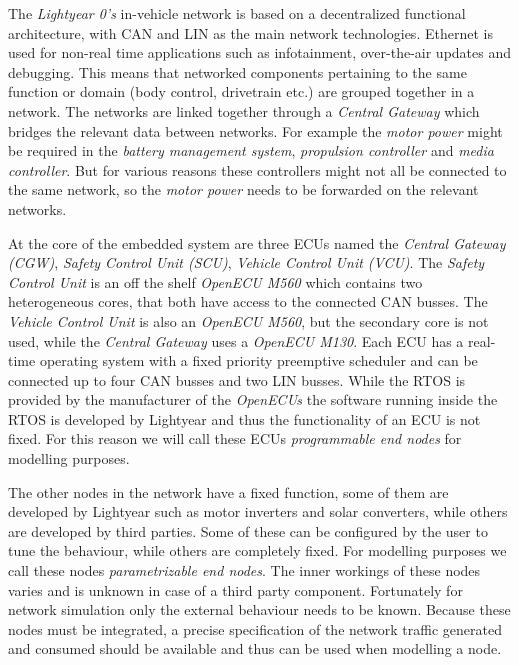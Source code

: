 \label{subsec:network}
The \textit{Lightyear 0's} in-vehicle network is based on a decentralized functional architecture, with CAN and LIN as the main network technologies. Ethernet is used for non-real time applications such as infotainment, over-the-air updates and debugging. This means that networked components pertaining to the same function or domain (body control, drivetrain etc.) are grouped together in a network. The networks are linked together through a \textit{Central Gateway} which bridges the relevant data between networks. For example the \textit{motor power} might be required in the \textit{battery management system}, \textit{propulsion controller} and \textit{media controller}. But for various reasons these controllers might not all be connected to the same network, so the \textit{motor power} needs to be forwarded on the relevant networks.

At the core of the embedded system are three ECUs named the \textit{Central Gateway (CGW)}, \textit{Safety Control Unit (SCU)}, \textit{Vehicle Control Unit (VCU)}. The \textit{Safety Control Unit} is an off the shelf \textit{OpenECU M560} which contains two heterogeneous cores, that both have access to the connected CAN busses. The \textit{Vehicle Control Unit} is also an \textit{OpenECU M560}, but the secondary core is not used, while the \textit{Central Gateway} uses a \textit{OpenECU M130}. Each ECU has a real-time operating system with a fixed priority preemptive scheduler and can be connected up to four CAN busses and two LIN busses. While the RTOS is provided by the manufacturer of the \textit{OpenECUs} the software running inside the RTOS is developed by Lightyear and thus the functionality of an ECU is not fixed. For this reason we will call these ECUs \textit{programmable end nodes} for modelling purposes.

The other nodes in the network have a fixed function, some of them are developed by Lightyear such as motor inverters and solar converters, while others are developed by third parties. Some of these can be configured by the user to tune the behaviour, while others are completely fixed. For modelling purposes we call these nodes \textit{parametrizable end nodes}. The inner workings of these nodes varies and is unknown in case of a third party component. Fortunately for network simulation only the external behaviour needs to be known. Because these nodes must be integrated, a precise specification of the network traffic generated and consumed should be available and thus can be used when modelling a node.

